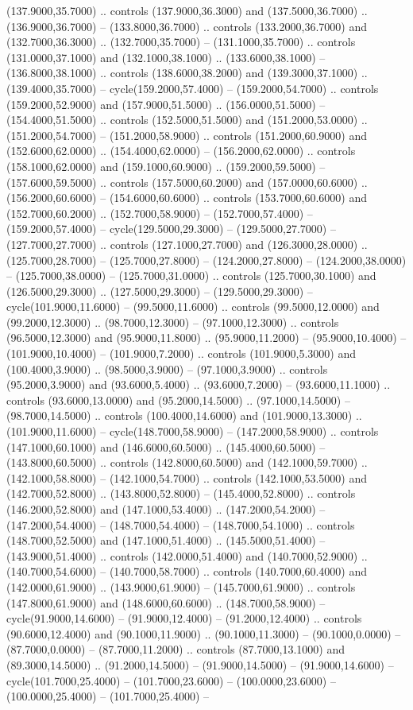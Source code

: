(137.9000,35.7000) .. controls (137.9000,36.3000) and (137.5000,36.7000) .. (136.9000,36.7000) -- (133.8000,36.7000) .. controls (133.2000,36.7000) and (132.7000,36.3000) .. (132.7000,35.7000) -- (131.1000,35.7000) .. controls (131.0000,37.1000) and (132.1000,38.1000) .. (133.6000,38.1000) -- (136.8000,38.1000) .. controls (138.6000,38.2000) and (139.3000,37.1000) .. (139.4000,35.7000) -- cycle(159.2000,57.4000) -- (159.2000,54.7000) .. controls (159.2000,52.9000) and (157.9000,51.5000) .. (156.0000,51.5000) -- (154.4000,51.5000) .. controls (152.5000,51.5000) and (151.2000,53.0000) .. (151.2000,54.7000) -- (151.2000,58.9000) .. controls (151.2000,60.9000) and (152.6000,62.0000) .. (154.4000,62.0000) -- (156.2000,62.0000) .. controls (158.1000,62.0000) and (159.1000,60.9000) .. (159.2000,59.5000) -- (157.6000,59.5000) .. controls (157.5000,60.2000) and (157.0000,60.6000) .. (156.2000,60.6000) -- (154.6000,60.6000) .. controls (153.7000,60.6000) and (152.7000,60.2000) .. (152.7000,58.9000) -- (152.7000,57.4000) -- (159.2000,57.4000) -- cycle(129.5000,29.3000) -- (129.5000,27.7000) -- (127.7000,27.7000) .. controls (127.1000,27.7000) and (126.3000,28.0000) .. (125.7000,28.7000) -- (125.7000,27.8000) -- (124.2000,27.8000) -- (124.2000,38.0000) -- (125.7000,38.0000) -- (125.7000,31.0000) .. controls (125.7000,30.1000) and (126.5000,29.3000) .. (127.5000,29.3000) -- (129.5000,29.3000) -- cycle(101.9000,11.6000) -- (99.5000,11.6000) .. controls (99.5000,12.0000) and (99.2000,12.3000) .. (98.7000,12.3000) -- (97.1000,12.3000) .. controls (96.5000,12.3000) and (95.9000,11.8000) .. (95.9000,11.2000) -- (95.9000,10.4000) -- (101.9000,10.4000) -- (101.9000,7.2000) .. controls (101.9000,5.3000) and (100.4000,3.9000) .. (98.5000,3.9000) -- (97.1000,3.9000) .. controls (95.2000,3.9000) and (93.6000,5.4000) .. (93.6000,7.2000) -- (93.6000,11.1000) .. controls (93.6000,13.0000) and (95.2000,14.5000) .. (97.1000,14.5000) -- (98.7000,14.5000) .. controls (100.4000,14.6000) and (101.9000,13.3000) .. (101.9000,11.6000) -- cycle(148.7000,58.9000) -- (147.2000,58.9000) .. controls (147.1000,60.1000) and (146.6000,60.5000) .. (145.4000,60.5000) -- (143.8000,60.5000) .. controls (142.8000,60.5000) and (142.1000,59.7000) .. (142.1000,58.8000) -- (142.1000,54.7000) .. controls (142.1000,53.5000) and (142.7000,52.8000) .. (143.8000,52.8000) -- (145.4000,52.8000) .. controls (146.2000,52.8000) and (147.1000,53.4000) .. (147.2000,54.2000) -- (147.2000,54.4000) -- (148.7000,54.4000) -- (148.7000,54.1000) .. controls (148.7000,52.5000) and (147.1000,51.4000) .. (145.5000,51.4000) -- (143.9000,51.4000) .. controls (142.0000,51.4000) and (140.7000,52.9000) .. (140.7000,54.6000) -- (140.7000,58.7000) .. controls (140.7000,60.4000) and (142.0000,61.9000) .. (143.9000,61.9000) -- (145.7000,61.9000) .. controls (147.8000,61.9000) and (148.6000,60.6000) .. (148.7000,58.9000) -- cycle(91.9000,14.6000) -- (91.9000,12.4000) -- (91.2000,12.4000) .. controls (90.6000,12.4000) and (90.1000,11.9000) .. (90.1000,11.3000) -- (90.1000,0.0000) -- (87.7000,0.0000) -- (87.7000,11.2000) .. controls (87.7000,13.1000) and (89.3000,14.5000) .. (91.2000,14.5000) -- (91.9000,14.5000) -- (91.9000,14.6000) -- cycle(101.7000,25.4000) -- (101.7000,23.6000) -- (100.0000,23.6000) -- (100.0000,25.4000) -- (101.7000,25.4000) -- 
